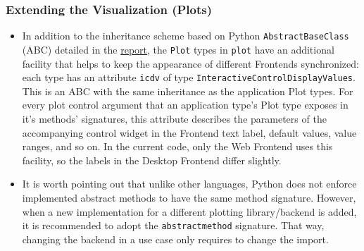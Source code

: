 \documentclass[]{article}
\providecommand{\tightlist}{%
  \setlength{\itemsep}{0pt}\setlength{\parskip}{0pt}}
\begin{document}
\subsubsection{Extending the Visualization
(Plots)}\label{extending-the-visualization-plots}

\begin{itemize}
\tightlist
\item
  In addition to the inheritance scheme based on Python
  \texttt{AbstractBaseClass} (ABC) detailed in the
  \href{./doc/report.pdf}{report}, the \texttt{Plot} types in
  \texttt{plot} have an additional facility that helps to keep the
  appearance of different Frontends synchronized: each type has an
  attribute \texttt{icdv} of type
  \texttt{InteractiveControlDisplayValues}. This is an ABC with the same
  inheritance as the application Plot types. For every plot control
  argument that an application type's Plot type exposes in it's methods'
  signatures, this attribute describes the parameters of the
  accompanying control widget in the Frontend text label, default
  values, value ranges, and so on. In the current code, only the Web
  Frontend uses this facility, so the labels in the Desktop Frontend
  differ slightly.\\
\item
  It is worth pointing out that unlike other languages, Python does not
  enforce implemented abstract methods to have the same method
  signature. However, when a new implementation for a different plotting
  library/backend is added, it is recommended to adopt the
  \texttt{abstractmethod} signature. That way, changing the backend in a
  use case only requires to change the import.
\end{itemize}
\end{document}
